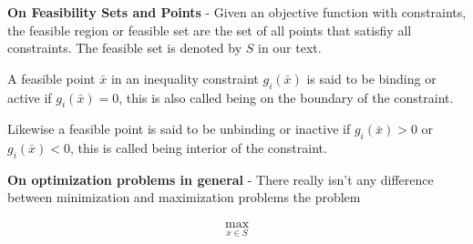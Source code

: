 \documentclass{article}
\begin{document}
\pagestyle{fancy}

\setcounter{section}{1}
\setcounter{subsection}{1}
\setcounter{subsubsection}{0}
\subsubsection{}
\textbf{On Feasibility Sets and Points} - Given an objective function with constraints, the feasible region or feasible set are the set of all points that satisfiy all constraints. The feasible set is denoted by $S$ in our text.

A feasible point $\bar{x}$ in an inequality constraint $g_i(\bar{x})$ is said to be binding or active if $g_i(\bar{x}) = 0$, this is also called being on the boundary of the constraint. 

Likewise a feasible point is said to be unbinding or inactive if $g_i(\bar{x}) > 0$ or $g_i(\bar{x}) < 0$, this is called being interior of the constraint.

\textbf{On optimization problems in general} - There really isn't any difference between minimization and maximization problems the problem 




\begin{align}
    \max_{x \in S}
\end{align}
\end{document}

